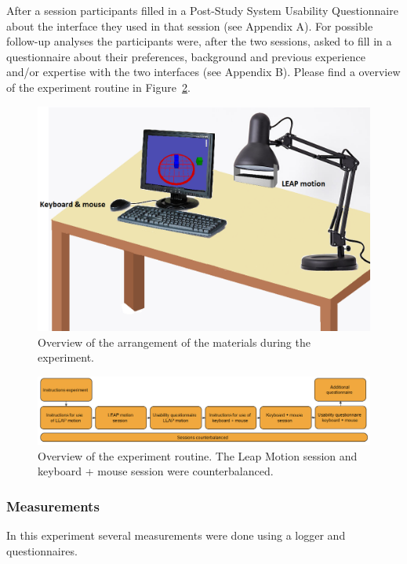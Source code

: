 After a session participants filled in a Post-Study System Usability Questionnaire about the interface they used in that session (see Appendix A). 
For possible follow-up analyses the participants were, after the two sessions, asked to fill in a questionnaire about their preferences, background and previous experience 
and/or expertise with the two interfaces (see Appendix B). Please find a overview of the experiment routine in Figure~\ref{fig:experimentroutine}.
\begin{figure}
\includegraphics[width=\textwidth]{imgs/configuration}
\caption{Overview of the arrangement of the materials during the experiment.}
\label{fig:configuration}
\end{figure}

\begin{figure}
\includegraphics[width=\textwidth]{imgs/experimentroutine}
\caption{Overview of the experiment routine. The Leap Motion session and keyboard + mouse session were counterbalanced.}
\label{fig:experimentroutine}
\end{figure}


\subsubsection{Measurements}
In this experiment several measurements were done using a logger and questionnaires. 

